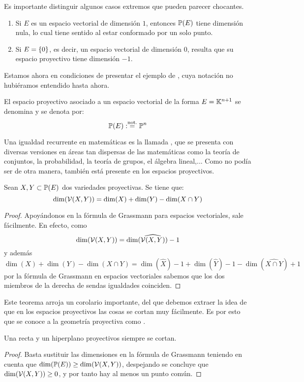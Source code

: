 Es importante distinguir algunos casos extremos que pueden parecer chocantes.
\begin{obs}
	\label{C1_obs_casosExtremosDim}
	\begin{enumerate}
		\item Si $E$ es un espacio vectorial de dimensión $1$, entonces $\mathbb{P}(E)$ tiene dimensión nula, lo cual tiene sentido al estar conformado por un solo punto.
		\item Si $E =\{0\}$, es decir, un espacio vectorial de dimensión $0$, resulta que su espacio proyectivo tiene dimensión $-1$.
	\end{enumerate}
\end{obs}
Estamos ahora en condiciones de presentar el ejemplo de , cuya notación no hubiéramos entendido hasta ahora.
\begin{exa}
	\label{C1_exa_espacioCanonico}
	El espacio proyectivo asociado a un espacio vectorial de la forma $E=\mathbb{K}^{n+1}$ se denomina  y se denota por:\[\mathbb{P}(E):\stackrel{\textrm{not.}}{=}\mathbb{P}^n\]
\end{exa}
Una igualdad recurrente en matemáticas es la llamada , que se presenta con diversas versiones en áreas tan dispersas de las matemáticas como la teoría de conjuntos, la probabilidad, la teoría de grupos, el álgebra lineal,... Como no podía ser de otra manera, también está presente en los espacios proyectivos.
\begin{theo}
	\label{C1_teo_grassmann}
	Sean $X,Y\subset\mathbb{P}(E)$ dos variedades proyectivas. Se tiene que:
	\[\dim(\mathcal{V}(X,Y))=\dim(X)+\dim(Y)-\dim(X\cap Y)\]
\end{theo}
\begin{proof}
	Apoyándonos en la fórmula de Grassmann para espacios vectoriales, sale fácilmente. En efecto, como  \[\dim(\mathcal{V}(X,Y))=\dim(\widehat{\mathcal{V}(X,Y)})-1\] y además \[\dim(X)+\dim(Y)-\dim(X\cap Y)=\dim(\widehat{X})-1+\dim(\widehat{Y})-1-\dim(\widehat{X\cap Y})+1\] por la fórmula de Grassmann en espacios vectoriales sabemos que los dos miembros de la derecha de sendas igualdades coinciden.
\end{proof}
Este teorema arroja un corolario importante, del que debemos extraer la idea de que en los espacios proyectivos las cosas se cortan muy fácilmente. Es por esto que se conoce a la geometría proyectiva como .
\begin{cor}
	\label{C1_cor_rectaHiperplano}
	Una recta y un hiperplano proyectivos siempre se cortan.
\end{cor}
\begin{proof}
	Basta sustituir las dimensiones en la fórmula de Grassmann teniendo en cuenta que $\dim(\mathbb{P}(E))\geq\dim(\mathcal{V}(X,Y))$, despejando se concluye que $\dim(\mathcal{V}(X,Y))\geq 0$, y por tanto hay al menos un punto común.
\end{proof}
